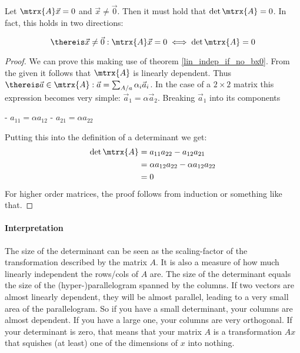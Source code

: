 \begin{theorem}  \label{det_0}
    Let $ \mtrx{A} \vec{x} = 0 $ and $ \vec{x} \neq \vec{0}$. Then it must hold that $\det{\mtrx{A}} = 0$.
    In fact, this holds in two directions:

    $$ \thereis \vec{x} \neq \vec{0}: \mtrx{A} \vec{x} = 0  \iff \det{\mtrx{A}} = 0 $$
\end{theorem}
\begin{proof}
    We can prove this making use of theorem \ref{lin_indep_if_no_bx0}. From the given it follows that $\mtrx{A}$ is linearly dependent. 
    Thus $\thereis \vec{a} \in \mtrx{A}: \vec{a} = \sum_{A/a} \alpha_i \vec{a}_i$. In the case of a $2 \times 2$ matrix this expression becomes very simple: $\vec{a}_1 = \alpha \vec{a}_2$. 
    Breaking $\vec{a}_1$ into its components
    
        - $a_{11} = \alpha a_{12}$
        - $a_{21} = \alpha a_{22}$
    
    Putting this into the definition of a determinant we get:
    \begin{equation}
        \begin{aligned}
            \det{\mtrx{A}}  &= a_{11}a_{22} - a_{12}a_{21} \\
                            &= \alpha a_{12} a_{22} - \alpha a_{12} a_{22} \\
                            &= 0
        \end{aligned}
    \end{equation}
    For higher order matrices, the proof follows from induction or something like that.
\end{proof}



\paragraph{Interpretation} The size of the determinant can be seen as the scaling-factor of the transformation described by the matrix $A$.
It is also a measure of how much linearly independent the rows/cols of $A$ are. The size of the determinant equals the size of the (hyper-)parallelogram spanned by the columns. If two vectors are almost linearly dependent, they will be almost parallel, leading to a very small area of the parallelogram. So if you have a small determinant, your columns are almost dependent. If you have a large one, your columns are very orthogonal. 
If your determinant is zero, that means that your matrix $A$ is a transformation $Ax$ that squishes (at least) one of the dimensions of $x$ into nothing.


